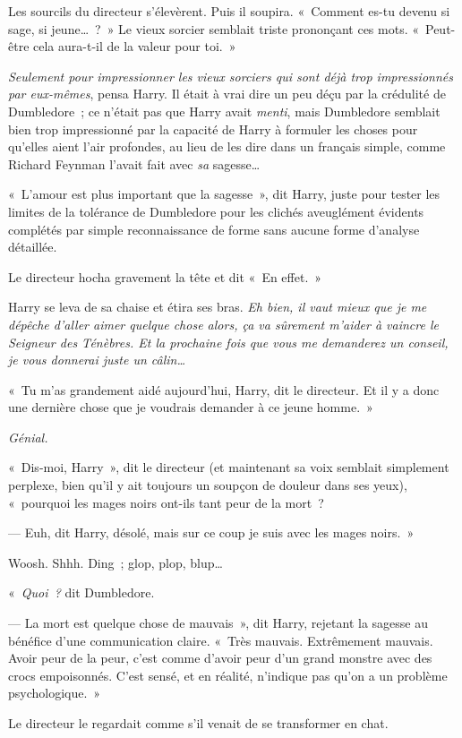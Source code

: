 Les sourcils du directeur s'élevèrent. Puis il soupira. «~Comment es-tu devenu si sage, si jeune…~?~» Le vieux sorcier semblait triste prononçant ces mots. «~Peut-être cela aura-t-il de la valeur pour toi.~»

\emph{Seulement pour impressionner les vieux sorciers qui sont déjà trop impressionnés par eux-mêmes}, pensa Harry. Il était à vrai dire un peu déçu par la crédulité de Dumbledore~; ce n'était pas que Harry avait \emph{menti}, mais Dumbledore semblait bien trop impressionné par la capacité de Harry à formuler les choses pour qu'elles aient l'air profondes, au lieu de les dire dans un français simple, comme Richard Feynman l'avait fait avec \emph{sa} sagesse…

«~L'amour est plus important que la sagesse~», dit Harry, juste pour tester les limites de la tolérance de Dumbledore pour les clichés aveuglément évidents complétés par simple reconnaissance de forme sans aucune forme d'analyse détaillée.

Le directeur hocha gravement la tête et dit «~En effet.~»

Harry se leva de sa chaise et étira ses bras. \emph{Eh bien, il vaut mieux que je me dépêche d'aller aimer quelque chose alors, ça va sûrement m'aider à vaincre le Seigneur des Ténèbres. Et la prochaine fois que vous me demanderez un conseil, je vous donnerai juste un câlin…}

«~Tu m'as grandement aidé aujourd'hui, Harry, dit le directeur. Et il y a donc une dernière chose que je voudrais demander à ce jeune homme.~»

\emph{Génial.}

«~Dis-moi, Harry~», dit le directeur (et maintenant sa voix semblait simplement perplexe, bien qu'il y ait toujours un soupçon de douleur dans ses yeux), «~pourquoi les mages noirs ont-ils tant peur de la mort~?

--- Euh, dit Harry, désolé, mais sur ce coup je suis avec les mages noirs.~»

Woosh. Shhh. Ding~; glop, plop, blup…

«~\emph{Quoi~?} dit Dumbledore.

--- La mort est quelque chose de mauvais~», dit Harry, rejetant la sagesse au bénéfice d'une communication claire. «~Très mauvais. Extrêmement mauvais. Avoir peur de la peur, c'est comme d'avoir peur d'un grand monstre avec des crocs empoisonnés. C'est sensé, et en réalité, n'indique pas qu'on a un problème psychologique.~»

Le directeur le regardait comme s'il venait de se transformer en chat.

